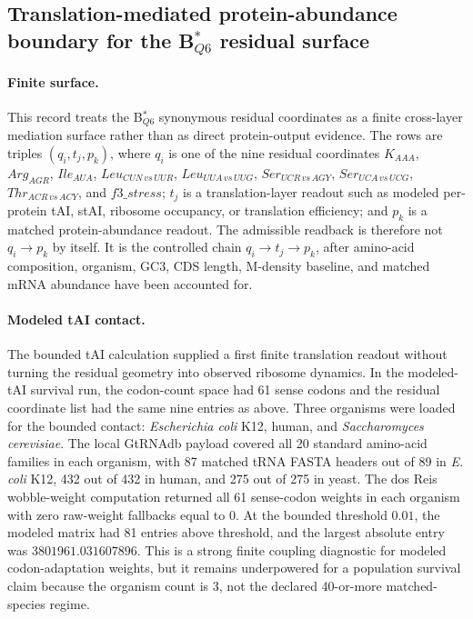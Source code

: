 \subsection{Translation-mediated protein-abundance boundary for the B$^{\ast}_{Q6}$ residual surface}
\label{sec:q6-translation-mediated-protein-abundance-cross-layer}

\paragraph{Finite surface.}
This record treats the B$^{\ast}_{Q6}$ synonymous residual coordinates as a finite cross-layer mediation surface rather than as direct protein-output evidence.  The rows are triples $(q_i,t_j,p_k)$, where $q_i$ is one of the nine residual coordinates
$K_{AAA}$, $Arg_{AGR}$, $Ile_{AUA}$, $Leu_{CUN\,vs\,UUR}$, $Leu_{UUA\,vs\,UUG}$, $Ser_{UCR\,vs\,AGY}$, $Ser_{UCA\,vs\,UCG}$, $Thr_{ACR\,vs\,ACY}$, and $f3\_stress$; $t_j$ is a translation-layer readout such as modeled per-protein tAI, stAI, ribosome occupancy, or translation efficiency; and $p_k$ is a matched protein-abundance readout.  The admissible readback is therefore not $q_i \to p_k$ by itself.  It is the controlled chain $q_i \to t_j \to p_k$, after amino-acid composition, organism, GC3, CDS length, M-density baseline, and matched mRNA abundance have been accounted for.

\paragraph{Modeled tAI contact.}
The bounded tAI calculation supplied a first finite translation readout without turning the residual geometry into observed ribosome dynamics.  In the modeled-tAI survival run, the codon-count space had 61 sense codons and the residual coordinate list had the same nine entries as above.  Three organisms were loaded for the bounded contact: \emph{Escherichia coli} K12, human, and \emph{Saccharomyces cerevisiae}.  The local GtRNAdb payload covered all 20 standard amino-acid families in each organism, with 87 matched tRNA FASTA headers out of 89 in \emph{E. coli} K12, 432 out of 432 in human, and 275 out of 275 in yeast.  The dos Reis wobble-weight computation returned all 61 sense-codon weights in each organism with zero raw-weight fallbacks equal to 0.  At the bounded threshold $0.01$, the modeled matrix had 81 entries above threshold, and the largest absolute entry was $3801961.031607896$.  This is a strong finite coupling diagnostic for modeled codon-adaptation weights, but it remains underpowered for a population survival claim because the organism count is 3, not the declared 40-or-more matched-species regime.

